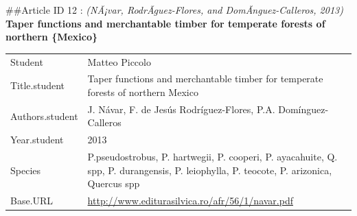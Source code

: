 \documentclass[]{article}
\begin{document}
\#\#Article ID 12 : \emph{(NÃ¡var, RodrÃ­guez-Flores, and
DomÃ­nguez-Calleros, 2013)} \textbf{Taper functions and merchantable
timber for temperate forests of northern \{Mexico\}}

\begin{longtable}[]{@{}ll@{}}
\toprule
\endhead
\begin{minipage}[t]{0.21\columnwidth}\raggedright
Student\strut
\end{minipage} & \begin{minipage}[t]{0.73\columnwidth}\raggedright
Matteo Piccolo\strut
\end{minipage}\tabularnewline
\begin{minipage}[t]{0.21\columnwidth}\raggedright
Title.student\strut
\end{minipage} & \begin{minipage}[t]{0.73\columnwidth}\raggedright
Taper functions and merchantable timber for temperate forests of
northern Mexico\strut
\end{minipage}\tabularnewline
\begin{minipage}[t]{0.21\columnwidth}\raggedright
Authors.student\strut
\end{minipage} & \begin{minipage}[t]{0.73\columnwidth}\raggedright
J. Návar, F. de Jesús Rodríguez-Flores, P.A. Domínguez-Calleros\strut
\end{minipage}\tabularnewline
\begin{minipage}[t]{0.21\columnwidth}\raggedright
Year.student\strut
\end{minipage} & \begin{minipage}[t]{0.73\columnwidth}\raggedright
2013\strut
\end{minipage}\tabularnewline
\begin{minipage}[t]{0.21\columnwidth}\raggedright
Species\strut
\end{minipage} & \begin{minipage}[t]{0.73\columnwidth}\raggedright
P.pseudostrobus, P. hartwegii, P. cooperi, P. ayacahuite, Q. spp, P.
durangensis, P. leiophylla, P. teocote, P. arizonica, Quercus spp\strut
\end{minipage}\tabularnewline
\begin{minipage}[t]{0.21\columnwidth}\raggedright
Base.URL\strut
\end{minipage} & \begin{minipage}[t]{0.73\columnwidth}\raggedright
\url{http://www.editurasilvica.ro/afr/56/1/navar.pdf}\strut
\end{minipage}\tabularnewline

\end{longtable}
\end{document}
